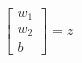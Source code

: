 \documentclass[preview]{standalone}
\begin{document}
\begin{align*}
[x_1 x_2 1] \begin{bmatrix} w_1 \\ w_2 \\ b \end{bmatrix} = z
\end{align*}
\end{document}
